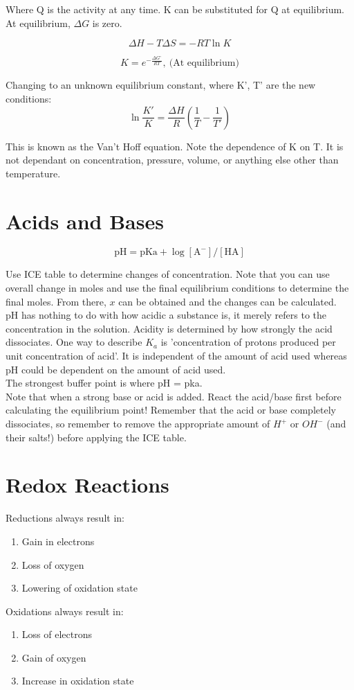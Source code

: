 \documentclass{article}
\begin{document}
Where Q is the activity at any time. K can be substituted for Q at equilibrium. At equilibrium, $\Delta G$ is zero.

\[
\Delta H - T\Delta S = -RT \ln K
\]

\[
K = e^{-\frac{\Delta G^{\circ}}{RT}},\ \text{(At equilibrium)}
\]


Changing to an unknown equilibrium constant, where K', T' are the new conditions:
\[
\ln \frac{K'}{K} = \frac{\Delta H}{R} (\frac{1}{T} - \frac{1}{T'})
\]

This is known as the Van't Hoff equation. Note the dependence of K on T. It is not dependant on concentration, pressure, volume, or anything else other than temperature.

\section{Acids and Bases}

\[
\text{pH} = \text{pKa} + \log[\text{A}^-]/[\text{HA}]
\]

Use ICE table to determine changes of concentration. Note that you can use overall change in moles and use the final equilibrium conditions to determine the final moles. From there, $x$ can be obtained and the changes can be calculated.\\

pH has nothing to do with how acidic a substance is, it merely refers to the concentration in the solution. Acidity is determined by how strongly the acid dissociates. One way to describe $K_a$ is 'concentration of protons produced per unit concentration of acid'. It is independent of the amount of acid used whereas pH could be dependent on the amount of acid used.\\

The strongest buffer point is where pH = pka.\\

Note that when a strong base or acid is added. React the acid/base first before calculating the equilibrium point! Remember that the acid or base completely dissociates, so remember to remove the appropriate amount of $H^+$ or $OH^-$ (and their salts!) before applying the ICE table.\\

\section{Redox Reactions}
Reductions always result in:
\begin{enumerate}
\item Gain in electrons
\item Loss of oxygen
\item Lowering of oxidation state
\end{enumerate}
Oxidations always result in:
\begin{enumerate}
\item Loss of electrons
\item Gain of oxygen
\item Increase in oxidation state

\end{enumerate}
\end{document}
